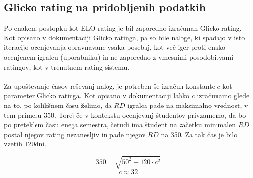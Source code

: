 \documentclass{IEEEtran}
\makeatletter
\let\old@subsection\subsection
\renewcommand{\subsection}[1]{\bigskip\old@subsection{#1}\@afterindentfalse\@afterheading}
\makeatother
\begin{document}
\subsection{Glicko rating na pridobljenih podatkih}

Po enakem postopku kot ELO rating je bil zaporedno izračunan Glicko rating. Kot opisano v dokumentaciji Glicko ratinga, pa so bile naloge,
ki spadajo v isto iteracijo ocenjevanja obravnavane vsaka posebaj, kot več iger proti enako ocenjenem igralcu (uporabniku) in ne zaporedno z vmesnimi posodobitvami ratingov, kot v trenutnem rating sistemu.
\hfill
\\
\\
Za upoštevanje časov reševanj nalog, je potreben še izračun konstante $c$ kot parameter Glicko ratinga. Kot opisano v dokumentaciji lahko $c$
izračunamo glede na to, po kolikšnem času želimo, da $RD$ igralca pade na maksimalno vrednost, v tem primeru 350. Torej če v kontekstu ocenjevanj študentov privzamemo, da bo po preteklem času enega semestra, četudi ima študent na začetku minimalen $RD$ postal njegov rating nezanesljiv in pade njegov $RD$ na 350. Za tak čas je bilo vzetih 120dni.

\begin{equation}
    350=\sqrt{50^{2}+120\cdot c^{2}}
\end{equation}
\begin{equation}
    c\approx 32
\end{equation}

\end{document}
